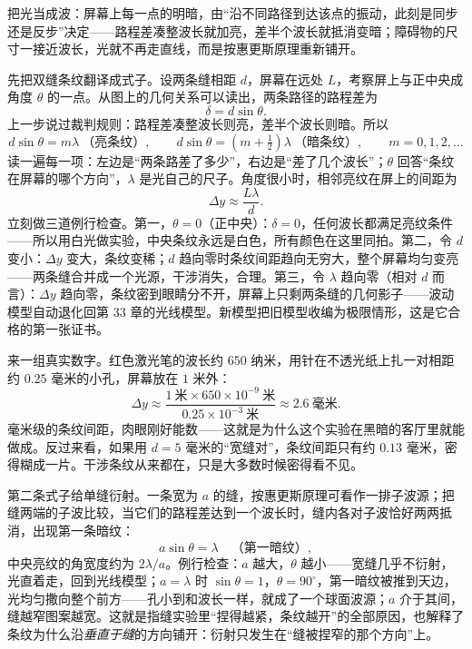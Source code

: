 
\begin{oneline}
把光当成波：屏幕上每一点的明暗，由“沿不同路径到达该点的振动，此刻是同步还是反步”决定——路程差凑整波长就加亮，差半个波长就抵消变暗；障碍物的尺寸一接近波长，光就不再走直线，而是按惠更斯原理重新铺开。
\end{oneline}


\begin{mainline}
先把双缝条纹翻译成式子。设两条缝相距 \(d\)，屏幕在远处 \(L\)，考察屏上与正中央成角度 \(\theta\) 的一点。从图上的几何关系可以读出，两条路径的路程差为
\[
  \delta = d\sin\theta .
\]
上一步说过裁判规则：路程差凑整波长则亮，差半个波长则暗。所以
\[
  d\sin\theta = m\lambda \ \text{（亮条纹）},\qquad
  d\sin\theta = \left(m+\tfrac12\right)\lambda \ \text{（暗条纹）},\qquad m=0,1,2,\dots
\]
读一遍每一项：左边是“两条路差了多少”，右边是“差了几个波长”；\(\theta\) 回答“条纹在屏幕的哪个方向”，\(\lambda\) 是光自己的尺子。角度很小时，相邻亮纹在屏上的间距为
\[
  \Delta y \approx \frac{L\lambda}{d}.
\]
立刻做三道例行检查。第一，\(\theta=0\)（正中央）：\(\delta=0\)，任何波长都满足亮纹条件——所以用白光做实验，中央条纹永远是白色，所有颜色在这里同拍。第二，令 \(d\) 变小：\(\Delta y\) 变大，条纹变稀；\(d\) 趋向零时条纹间距趋向无穷大，整个屏幕均匀变亮——两条缝合并成一个光源，干涉消失，合理。第三，令 \(\lambda\) 趋向零（相对 \(d\) 而言）：\(\Delta y\) 趋向零，条纹密到眼睛分不开，屏幕上只剩两条缝的几何影子——波动模型自动退化回第 33 章的光线模型。新模型把旧模型收编为极限情形，这是它合格的第一张证书。

来一组真实数字。红色激光笔的波长约 \(650\) 纳米，用针在不透光纸上扎一对相距约 \(0.25\) 毫米的小孔，屏幕放在 \(1\) 米外：
\[
  \Delta y \approx \frac{1\ \text{米}\times 650\times10^{-9}\ \text{米}}{0.25\times10^{-3}\ \text{米}}
  \approx 2.6\ \text{毫米}.
\]
毫米级的条纹间距，肉眼刚好能数——这就是为什么这个实验在黑暗的客厅里就能做成。反过来看，如果用 \(d=5\) 毫米的“宽缝对”，条纹间距只有约 \(0.13\) 毫米，密得糊成一片。干涉条纹从来都在，只是大多数时候密得看不见。

第二条式子给单缝衍射。一条宽为 \(a\) 的缝，按惠更斯原理可看作一排子波源；把缝两端的子波比较，当它们的路程差达到一个波长时，缝内各对子波恰好两两抵消，出现第一条暗纹：
\[
  a\sin\theta = \lambda \quad\text{（第一暗纹）},
\]
中央亮纹的角宽度约为 \(2\lambda/a\)。例行检查：\(a\) 越大，\(\theta\) 越小——宽缝几乎不衍射，光直着走，回到光线模型；\(a=\lambda\) 时 \(\sin\theta=1\)，\(\theta=90^\circ\)，第一暗纹被推到天边，光均匀撒向整个前方——孔小到和波长一样，就成了一个球面波源；\(a\) 介于其间，缝越窄图案越宽。这就是指缝实验里“捏得越紧，条纹越开”的全部原因，也解释了条纹为什么沿\emph{垂直于缝}的方向铺开：衍射只发生在“缝被捏窄的那个方向”上。
\end{mainline}

